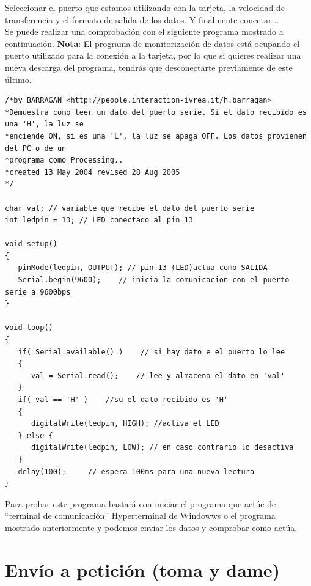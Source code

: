 Seleccionar el puerto que estamos utilizando con la tarjeta, la velocidad de transferencia y el formato de salida de los datos. Y finalmente conectar...\\
Se puede realizar una comprobación con el siguiente programa mostrado a continuación.
\textbf{Nota}: El programa de monitorización de datos está ocupando el puerto utilizado para la conexión a la tarjeta, por lo que si quieres realizar una nueva descarga del programa, tendrás que desconectarte previamente de este último.\\
\begin{lstlisting}
/*by BARRAGAN <http://people.interaction-ivrea.it/h.barragan>
*Demuestra como leer un dato del puerto serie. Si el dato recibido es una 'H', la luz se
*enciende ON, si es una 'L', la luz se apaga OFF. Los datos provienen del PC o de un
*programa como Processing..
*created 13 May 2004 revised 28 Aug 2005
*/

char val; // variable que recibe el dato del puerto serie
int ledpin = 13; // LED conectado al pin 13

void setup()
{
   pinMode(ledpin, OUTPUT); // pin 13 (LED)actua como SALIDA
   Serial.begin(9600);    // inicia la comunicacion con el puerto serie a 9600bps
}

void loop()
{
   if( Serial.available() )    // si hay dato e el puerto lo lee
   {
      val = Serial.read();    // lee y almacena el dato en 'val'
   }
   if( val == 'H' )    //su el dato recibido es 'H'
   {
      digitalWrite(ledpin, HIGH); //activa el LED
   } else {
      digitalWrite(ledpin, LOW); // en caso contrario lo desactiva
   }
   delay(100);     // espera 100ms para una nueva lectura
}
\end{lstlisting}
Para probar este programa bastará con iniciar el programa que actúe de “terminal de comunicación” Hyperterminal de Windowws o el programa mostrado anteriormente y podemos enviar los datos y comprobar como actúa.

\section{Envío a petición (toma y dame)}

